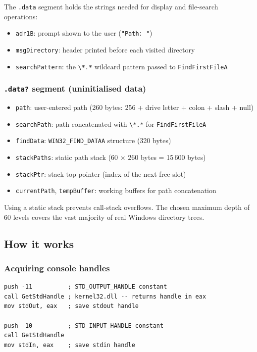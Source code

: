 \documentclass[12pt,a4paper]{article}
\begin{document}
The \texttt{.data} segment holds the strings needed for display and file-search operations:

\begin{itemize}
  \item \texttt{adr1B}: prompt shown to the user (\texttt{"Path: "})
  \item \texttt{msgDirectory}: header printed before each visited directory
  \item \texttt{searchPattern}: the \texttt{\textbackslash{}*.*} wildcard pattern passed to \texttt{FindFirstFileA}
\end{itemize}

\subsubsection{\texttt{.data?} segment (uninitialised data)}

\begin{itemize}
  \item \texttt{path}: user-entered path (260 bytes: 256 + drive letter + colon + slash + null)
  \item \texttt{searchPath}: path concatenated with \texttt{\textbackslash{}*.*} for \texttt{FindFirstFileA}
  \item \texttt{findData}: \texttt{WIN32\_FIND\_DATAA} structure (320 bytes)
  \item \texttt{stackPaths}: static path stack (60 × 260 bytes = 15\,600 bytes)
  \item \texttt{stackPtr}: stack top pointer (index of the next free slot)
  \item \texttt{currentPath}, \texttt{tempBuffer}: working buffers for path concatenation
\end{itemize}

Using a static stack prevents call-stack overflows. The chosen maximum depth of 60 levels covers the vast majority of real Windows directory trees.

\subsection{How it works}

\subsubsection{Acquiring console handles}

\begin{lstlisting}
push -11          ; STD_OUTPUT_HANDLE constant
call GetStdHandle ; kernel32.dll -- returns handle in eax
mov stdOut, eax   ; save stdout handle

push -10          ; STD_INPUT_HANDLE constant
call GetStdHandle
mov stdIn, eax    ; save stdin handle
\end{lstlisting}
\end{document}
